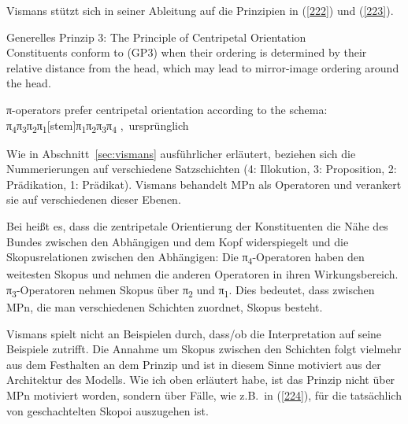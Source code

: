 Vismans stützt sich in seiner Ableitung auf die Prinzipien in (\ref{222}) und (\ref{223}).

\begin{exe}
	\ex\label{222} 
		Generelles Prinzip 3: The Principle of Centripetal Orientation \\
		Constituents conform to (GP3) when their ordering is determined by their relative distance from the head, which may lead to  mirror-image  					ordering around the head.
		\hfill\hbox{\citet[401]{Dik1997}}
\end{exe}

\begin{exe}
	\ex\label{223} 
	π-operators prefer centripetal orientation according to the schema:\\	π\textsubscript{4}π\textsubscript{3}π\textsubscript{2}π\textsubscript{1}\textrm{[stem]}π\textsubscript{1}π\textsubscript{2}π\textsubscript{3}π\textsubscript{4}
 	\newline
 	\hbox{}\hfill\hbox{\citet[414]{Dik1997}, ursprünglich \citet[141]{Hengeveld1989}}
\end{exe}
Wie in Abschnitt~\ref{sec:vismans} ausführlicher  erläutert, beziehen  sich  die Nummerierungen  auf verschiedene Satzschichten  (4: Illokution, 3: Proposition, 2: Prädikation, 1: Prädikat). Vismans behandelt MPn als Operatoren  und verankert sie auf verschiedenen dieser Ebenen.

Bei \citet[402]{Dik1997} heißt es, dass die zentripetale Orientierung der Konstituen\-ten die Nähe des Bundes zwischen den Abhängigen und dem Kopf widerspiegelt und die Skopusrelationen zwischen den Abhängigen: Die π\textsubscript{4}-Operatoren haben den weitesten Skopus und nehmen die anderen Operatoren in ihren Wirkungsbereich. π\textsubscript{3}-Operatoren nehmen Skopus über π\textsubscript{2} und π\textsubscript{1}. Dies bedeutet, dass zwischen MPn, die man verschiedenen Schichten zuordnet, Skopus besteht.

Vismans spielt nicht an Beispielen durch, dass/ob die Interpretation auf seine Beispiele zutrifft. Die Annahme um Skopus zwischen den Schichten folgt vielmehr aus dem Festhalten an dem Prinzip und ist in diesem Sinne motiviert aus der Architektur des Modells. Wie ich oben erläutert habe, ist das Prinzip nicht über MPn motiviert worden, sondern über Fälle, wie z.B.\ in (\ref{224}), für die tatsächlich von geschachtelten Skopoi auszugehen ist.

